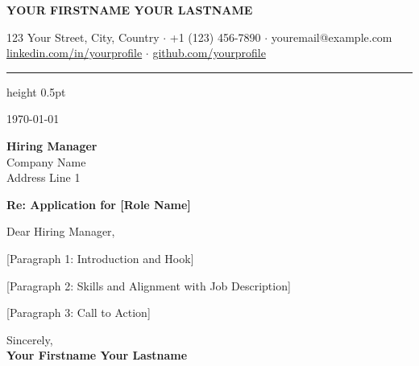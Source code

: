\documentclass[11pt,a4paper]{article}
\makeatletter
\newcommand{\makeextraheader}{
    \begin{center}
        {\Huge \bfseries \color{accent} \uppercase{Your Firstname Your Lastname}} \\ \vspace{0.5em}
        
        \color{lightgray} \small
        123 Your Street, City, Country $\cdot$ 
        +1 (123) 456-7890 $\cdot$ 
        youremail@example.com \\
        \href{https://linkedin.com/in/yourprofile}{linkedin.com/in/yourprofile} $\cdot$
        \href{https://github.com/yourprofile}{github.com/yourprofile}
    \end{center}
    \vspace{1em}
    \hrule height 0.5pt
    \vspace{2em}
}
\newcommand{\recipientblock}[3]{
    \begin{flushleft}
        \textbf{#1} \\
        #2 \\
        #3
    \end{flushleft}
    \vspace{1em}
}
\newcommand{\subject}[1]{
    \textbf{Re: #1}
    \vspace{1em}
}
\newcommand{\opening}[1]{
    #1
    \vspace{1em}
}
\newcommand{\closing}[1]{
    \vspace{2em}
    #1 \\ \vspace{3em} %
    \textbf{Your Firstname Your Lastname} %
}
\makeatother
\begin{document}
\makeextraheader

\today

\vspace{1em}


\recipientblock{Hiring Manager}{Company Name}{Address Line 1}

\subject{Application for [Role Name]}

\opening{Dear Hiring Manager,}

[Paragraph 1: Introduction and Hook]

[Paragraph 2: Skills and Alignment with Job Description]

[Paragraph 3: Call to Action]

\closing{Sincerely,}
\end{document}
